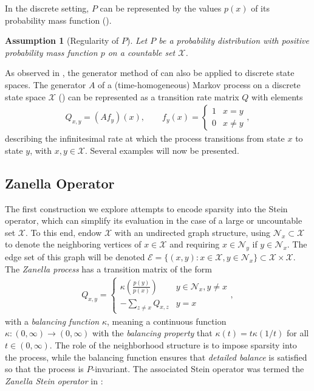 \documentclass[12pt,paper=letter]{scrreprt}
\newtheorem{assumption}{Assumption}[chapter]
\newcommand{\xset}[0]{\mathcal{X}} %
\newcommand{\nbr}[1][x]{\mathcal{N}_{#1}} %
\begin{document}
In the discrete setting, $P$ can be represented by the values $p(x)$ of its probability mass function ().

\begin{assumption}[Regularity of $P$]
\label{ass: discrete}
    Let $P$ be a probability distribution with positive probability mass function $p$ on a countable set $\xset$.
\end{assumption}

As observed in \citet{henderson1997variance,shi2022gradient}, the generator method of \citet{barbour1988stein,barbour1990stein,gotze1991rate} can also be applied to discrete state spaces. 
The generator $A$ of a (time-homogeneous) Markov process on a discrete state space $\xset$ () can be represented as a transition rate matrix $Q$ with elements
\begin{align*}
    Q_{x,y} = (A f_y)(x), \qquad f_y(x) = \left\{ \begin{array}{ll} 1 & x = y \\ 0 & x \neq y \end{array} \right. ,
\end{align*}
describing the infinitesimal rate at which the process transitions from state $x$ to state $y$, with $x,y \in \xset$.
Several examples will now be presented.

\subsection{Zanella Operator}

The first construction we explore attempts to encode sparsity into the Stein operator, which can simplify its evaluation in the case of a large or uncountable set $\xset$.
To this end, endow $\xset$ with an undirected graph structure, using $\nbr \subset \xset$ to denote the neighboring vertices of $x \in \xset$ and requiring $x \in \nbr[y]$ if $y \in \nbr$.
The edge set of this graph will be denoted $\mathcal{E} = \{(x,y) : x \in \xset, y \in \nbr \} \subset \xset \times \xset$.
The \emph{Zanella process} \citep{zanella2019informed} has a transition matrix of the form
\begin{align} \label{eq:zanella-generator}
    Q_{x,y} = \left\{ \begin{array}{ll} \kappa\left(\frac{p(y)}{p(x)}\right) & y \in \nbr, y \neq x \\
    -\sum_{z \neq x} Q_{x,z} & y = x \end{array} \right. ,
\end{align}
with a \emph{balancing function} $\kappa$, meaning a continuous function $\kappa : (0,\infty) \rightarrow (0,\infty)$ with the \emph{balancing property} that $\kappa(t) = t\kappa(1/t)$ for all $t \in (0,\infty)$.
The role of the neighborhood structure is to impose sparsity into the process, while the balancing function ensures that \emph{detailed balance} is satisfied so that the process is $P$-invariant.
The associated Stein operator was termed the \emph{Zanella Stein operator} in \citet{hodgkinson2020reproducing,shi2022gradient}:
\end{document}
